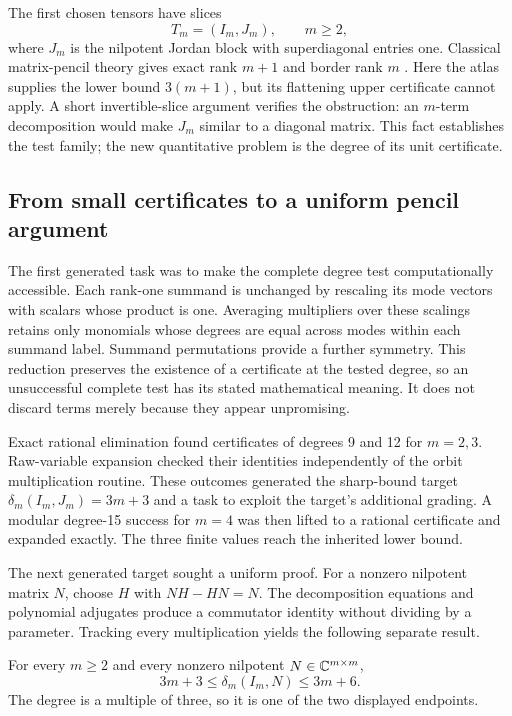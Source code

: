 The first chosen tensors have slices
\[
                  T_m=(I_m,J_m),\qquad m\ge2,
\]
where $J_m$ is the nilpotent Jordan block with superdiagonal entries one. Classical matrix-pencil theory gives exact rank $m+1$ and border rank $m$ \cite{buczynskilandsberg}. Here the atlas supplies the lower bound $3(m+1)$, but its flattening upper certificate cannot apply. A short invertible-slice argument verifies the obstruction: an $m$-term decomposition would make $J_m$ similar to a diagonal matrix. This fact establishes the test family; the new quantitative problem is the degree of its unit certificate.

\subsection{From small certificates to a uniform pencil argument}

The first generated task was to make the complete degree test computationally accessible. Each rank-one summand is unchanged by rescaling its mode vectors with scalars whose product is one. Averaging multipliers over these scalings retains only monomials whose degrees are equal across modes within each summand label. Summand permutations provide a further symmetry. This reduction preserves the existence of a certificate at the tested degree, so an unsuccessful complete test has its stated mathematical meaning. It does not discard terms merely because they appear unpromising.

Exact rational elimination found certificates of degrees 9 and 12 for $m=2,3$. Raw-variable expansion checked their identities independently of the orbit multiplication routine. These outcomes generated the sharp-bound target $\delta_m(I_m,J_m)=3m+3$ and a task to exploit the target's additional grading. A modular degree-15 success for $m=4$ was then lifted to a rational certificate and expanded exactly. The three finite values reach the inherited lower bound.

The next generated target sought a uniform proof. For a nonzero nilpotent matrix $N$, choose $H$ with $NH-HN=N$. The decomposition equations and polynomial adjugates produce a commutator identity without dividing by a parameter. Tracking every multiplication yields the following separate result.

\begin{theorem}\label{thm:pencil}
For every $m\ge2$ and every nonzero nilpotent $N\in\mathbb{C}^{m\times m}$,
\begin{equation}\label{eq:pencil-bound}
                3m+3\le\delta_m(I_m,N)\le3m+6.
\end{equation}
The degree is a multiple of three, so it is one of the two displayed endpoints.
\end{theorem}

